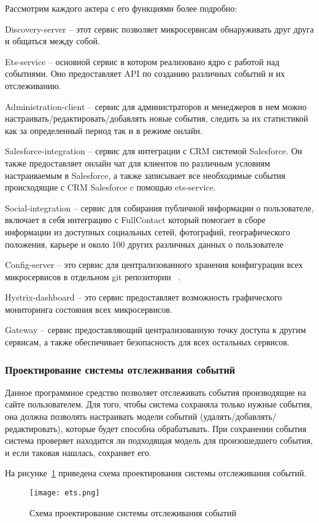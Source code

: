 Рассмотрим каждого актера с его функциями более подробно:

Discovery-server -- этот сервис позволяет микросервисам обнаруживать друг друга и общаться между собой.

Ets-service -- основной сервис в котором реализовано ядро с работой над событиями. Оно предоставляет API по созданию различных событий и их отслеживанию.

Administration-client -- сервис для администраторов и менеджеров в нем можно настраивать/редактировать/добавлять новые события, следить за их статистикой как за определенный период так и в режиме онлайн. 

Salesforce-integration -- сервис для интеграции с СRM системой Salesforce. Он также предоставляет онлайн чат для клиентов по различным условиям настраиваемым в Salesforce, а также записывает все необходимые события происходящие с CRM Salesforce c помощью ets-service.

Social-integration -- сервис для собирания публичной информации о пользователе, включает в себя интеграцию с FullContact который помогает в сборе информации из доступных социальных сетей, фотографий, географического положения, карьере и около 100 других различных данных о пользователе

Config-server -- это сервис для централизованного хранения конфигурации всех микросервисов в отдельном git репозитории ~\cite{cloud_config}.

Hystrix-dashboard -- это сервис предоставляет возможность графического мониторинга состояния всех микросервисов.

Gateway -- сервис предоставляющий централизованную точку доступа к другим сервисам, а также обеспечивает безопасность для всех остальных сервисов.

\subsubsection{Проектирование системы отслеживания событий}

Данное программное средство позволяет отслеживать события производящие на сайте пользователем. Для того, чтобы система сохраняла только нужные события, она должна позволять настраивать модели событий (удалять/добавлять/редактировать), которые будет способна обрабатывать. При сохранении события система проверяет находится ли подходящая модель для произошедшего события, и если таковая нашлась, сохраняет его.


На рисунке~\ref{fig:des-ets} приведена схема проектирования системы отслеживания событий.
\pagebreak
\begin{figure}[ht]
\centering
  \texttt{[image: ets.png]}  
  \caption{Схема проектирование системы отслеживания событий}
	\label{fig:des-ets}
\end{figure} 	


